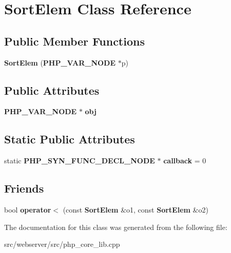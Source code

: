 \section{SortElem Class Reference}
\label{classSortElem}
\subsection*{Public Member Functions}
\begin{DoxyCompactItemize}
\item 
{\bfseries SortElem} ({\bf PHP\_\-VAR\_\-NODE} $\ast$p)\label{classSortElem_aa8bad0401adcad6b5763d82096866884}

\end{DoxyCompactItemize}
\subsection*{Public Attributes}
\begin{DoxyCompactItemize}
\item 
{\bf PHP\_\-VAR\_\-NODE} $\ast$ {\bfseries obj}\label{classSortElem_a45efadfbd30cdeb11c8f85db2f73df50}

\end{DoxyCompactItemize}
\subsection*{Static Public Attributes}
\begin{DoxyCompactItemize}
\item 
static {\bf PHP\_\-SYN\_\-FUNC\_\-DECL\_\-NODE} $\ast$ {\bfseries callback} = 0\label{classSortElem_a44d40417101c4f5eb898281c24ef1eb7}

\end{DoxyCompactItemize}
\subsection*{Friends}
\begin{DoxyCompactItemize}
\item 
bool {\bfseries operator$<$} (const {\bf SortElem} \&o1, const {\bf SortElem} \&o2)\label{classSortElem_a347818b312b4f3de91547edaf4b04f8e}

\end{DoxyCompactItemize}


The documentation for this class was generated from the following file:\begin{DoxyCompactItemize}
\item 
src/webserver/src/php\_\-core\_\-lib.cpp\end{DoxyCompactItemize}
